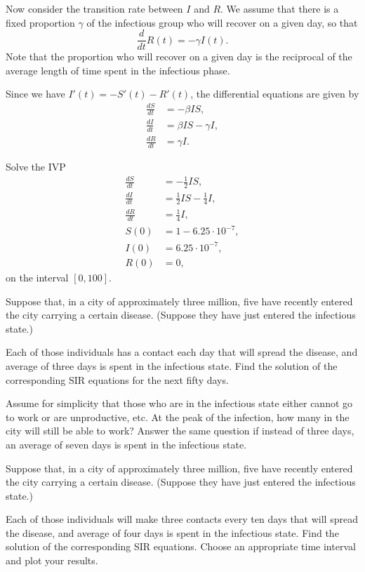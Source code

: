  Now consider the transition rate between $I$ and $R$. We assume that there is a fixed proportion $\gamma$ of the infectious group who will recover on a given day, so that 
 \[\frac{d}{dt}R(t) = -\gamma I(t).\]
 Note that the proportion who will recover on a given day is the reciprocal of the average length of time spent in the infectious phase. 
 
 Since we have $I'(t) = - S'(t) - R'(t)$, the  differential equations are given by
\begin{align*}
\frac{dS}{dt} &=-\beta IS ,\\
\frac{dI}{dt} &= \beta I S-\gamma I, \\
\frac{dR}{dt} &=\gamma I.
\end{align*}


\begin{problem}
Solve the IVP
\begin{align*}
\frac{dS}{dt} &=-\frac{1}{2} IS ,\\
\frac{dI}{dt} &= \frac{1}{2} I S-\frac{1}{4} I, \\
\frac{dR}{dt} &=\frac{1}{4} I,\\
S(0) &= 1-6.25\cdot10^{-7},\\
I(0) &= 6.25\cdot10^{-7},\\
R(0) &=0,
\end{align*}
on the interval $[0,100]$.
\end{problem}


\begin{problem}
Suppose that, in a city of approximately three million, five have recently entered the city carrying a certain disease. (Suppose they have just entered the infectious state.)

Each of those individuals has a contact each day that will spread the disease, and average of three days is spent in the infectious state. Find the solution of the corresponding SIR equations for the next fifty days. 

Assume for simplicity that those who are in the infectious state either cannot go to work or are unproductive, etc. At the peak of the infection, how many in the city will still be able to work? 
Answer the same question if instead of three days, an average of seven days is spent in the infectious state.
\end{problem}


\begin{problem}
Suppose that, in a city of approximately three million, five have recently entered the city carrying a certain disease. (Suppose they have just entered the infectious state.) 

Each of those individuals will make three contacts every ten days that will spread the disease, and average of four days is spent in the infectious state. Find the solution of the corresponding SIR equations. Choose an appropriate time interval and plot your results.
\end{problem}









